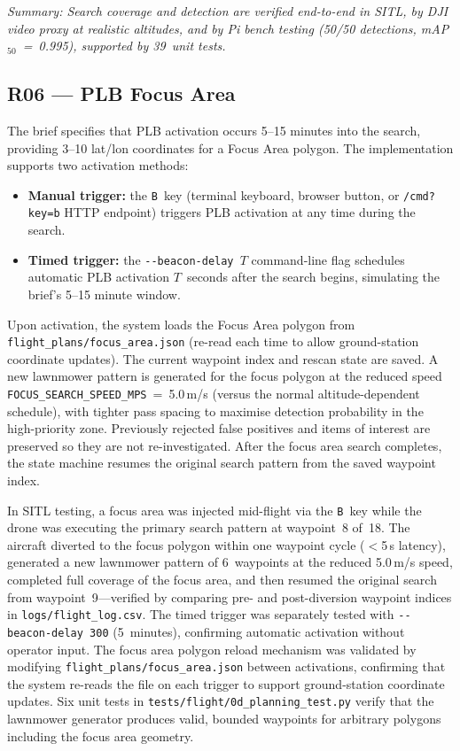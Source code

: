 \noindent\textit{Summary: Search coverage and detection are verified end-to-end in SITL, by DJI video proxy at realistic altitudes, and by Pi bench testing (50/50 detections, mAP$_{50}$~=~0.995), supported by 39~unit tests.}

\subsection{R06 --- PLB Focus Area}

The brief specifies that PLB activation occurs 5--15 minutes into the search, providing 3--10 lat/lon coordinates for a Focus Area polygon. The implementation supports two activation methods:

\begin{itemize}
    \item \textbf{Manual trigger:} the \texttt{B}~key (terminal keyboard, browser button, or \texttt{/cmd?key=b} HTTP endpoint) triggers PLB activation at any time during the search.
    \item \textbf{Timed trigger:} the \texttt{-{}-beacon-delay $T$} command-line flag schedules automatic PLB activation $T$~seconds after the search begins, simulating the brief's 5--15 minute window.
\end{itemize}

\noindent Upon activation, the system loads the Focus Area polygon from \texttt{flight\_plans/focus\_area.json} (re-read each time to allow ground-station coordinate updates). The current waypoint index and rescan state are saved. A new lawnmower pattern is generated for the focus polygon at the reduced speed \texttt{FOCUS\_SEARCH\_SPEED\_MPS}~=~5.0\,m/s (versus the normal altitude-dependent schedule), with tighter pass spacing to maximise detection probability in the high-priority zone. Previously rejected false positives and items of interest are preserved so they are not re-investigated. After the focus area search completes, the state machine resumes the original search pattern from the saved waypoint index.

In SITL testing, a focus area was injected mid-flight via the \texttt{B}~key while the drone was executing the primary search pattern at waypoint~8 of~18. The aircraft diverted to the focus polygon within one waypoint cycle ($<$5\,s latency), generated a new lawnmower pattern of 6~waypoints at the reduced 5.0\,m/s speed, completed full coverage of the focus area, and then resumed the original search from waypoint~9---verified by comparing pre- and post-diversion waypoint indices in \texttt{logs/flight\_log.csv}. The timed trigger was separately tested with \texttt{-{}-beacon-delay~300} (5~minutes), confirming automatic activation without operator input. The focus area polygon reload mechanism was validated by modifying \texttt{flight\_plans/focus\_area.json} between activations, confirming that the system re-reads the file on each trigger to support ground-station coordinate updates. Six unit tests in \texttt{tests/flight/0d\_planning\_test.py} verify that the lawnmower generator produces valid, bounded waypoints for arbitrary polygons including the focus area geometry.

